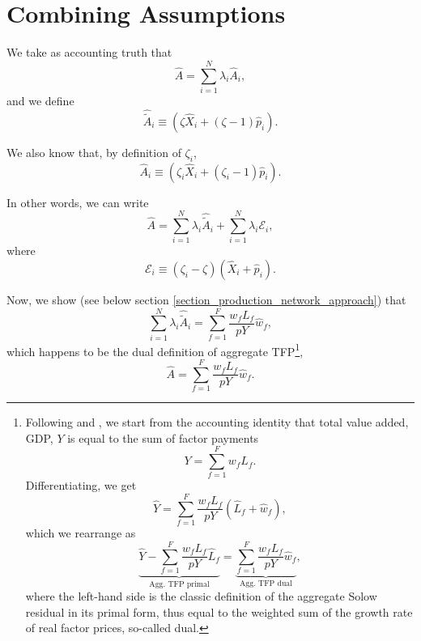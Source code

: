 \documentclass[11pt]{article}
\begin{document}
\section{Combining Assumptions}


We take as accounting truth that
\[
    \hat{A} = \sum_{i=1}^N \lambda_i \hat{A}_i,
\]
and we define
\[
\hat{\tilde{A}}_i \equiv \left(\zeta\hat{X}_i+(\zeta - 1) \hat{p}_i\right).
\]

We also know that, by definition of $\zeta_i$,
\[
\hat{A}_i \equiv \left(\zeta_i \hat{X}_i+(\zeta_i - 1) \hat{p}_i\right).
\]

In other words, we can write
\begin{equation}
\hat{A}   = \sum_{i=1}^N \lambda_i \hat{\tilde{A}}_i + \sum_{i=1}^N \lambda_i \mathcal{E}_i,
\label{eq:ahat_plus_error}
\end{equation}
where
\begin{equation}
\mathcal{E}_i \equiv  (\zeta_i - \zeta) \left( \hat{X}_i + \hat{p}_i\right).
\label{eq:eps}
\end{equation}


Now, we show (see below section \ref{section_production_network_approach}) that 
\begin{equation}
\label{eq_agg_A_appendix}
\sum_{i=1}^N \lambda_i \hat{\tilde{A}}_i = \sum_{f=1}^F \frac{w_fL_{f}}{pY}\hat{w}_f,
\end{equation}
which happens to be the dual definition of aggregate TFP\footnote{
Following \cite{hsieh_productivity_1999} and \cite{antras_factor_2003}, we start from the accounting identity that total value added, GDP, $Y$ is equal to the sum of factor payments
\begin{equation*}
    Y=\sum_{f=1}^F w_f L_f.
\end{equation*}
Differentiating, we get
\begin{equation*}
    \hat{Y}=\sum_{f=1}^F \frac{w_fL_{f}}{pY}(\hat{L}_f+\hat{w}_f),
\end{equation*}
which we rearrange as
\begin{equation*}
    \underbrace{\hat{Y}-\sum_{f=1}^F \frac{w_fL_{f}}{pY}\hat{L}_f}_{\text{Agg. TFP primal}}= \underbrace{\sum_{f=1}^F \frac{w_fL_{f}}{pY}\hat{w}_f}_{\text{Agg. TFP dual}},
\end{equation*}
where the left-hand side is the classic definition of the aggregate Solow residual in its primal form, thus equal to the weighted sum of the growth rate of real factor prices, so-called dual.

},
\begin{equation}
\label{eq_agg_A_dual}
\hat{A} = \sum_{f=1}^F \frac{w_fL_{f}}{pY}\hat{w}_f.
\end{equation}
\end{document}
